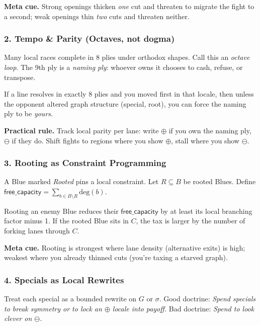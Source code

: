 \documentclass[11pt]{article}
\begin{document}
\begin{itemize}
\noindent\textbf{Meta cue.} Strong openings thicken \emph{one} cut and threaten to migrate the fight to a second; weak openings thin \emph{two} cuts and threaten neither.

\subsubsection{2. Tempo \& Parity (Octaves, not dogma)}
\label{ael-core:parity}
Many local races complete in \(8\) plies under orthodox shapes. Call this an \emph{octave loop}. The 9th ply is a \emph{naming ply}: whoever owns it chooses to cash, refuse, or transpose.

\begin{proposition}
If a line resolves in exactly \(8\) plies and you moved first in that locale, then unless the opponent altered graph structure (special, root), you can force the naming ply to be \emph{yours}. 
\end{proposition}

\noindent\textbf{Practical rule.} Track local parity per lane: write \(\oplus\) if you own the naming ply, \(\ominus\) if they do. Shift fights to regions where you show \(\oplus\), stall where you show \(\ominus\).

\subsubsection{3. Rooting as Constraint Programming}
\label{ael-core:root}
A Blue marked \emph{Rooted} pins a local constraint. Let \(R\subseteq B\) be rooted Blues. Define \(\mathsf{free\_capacity} = \sum_{b\in B\setminus R}\text{deg}(b)\). 

\begin{lemma}
Rooting an enemy Blue reduces their \(\mathsf{free\_capacity}\) by at least its local branching factor minus 1. If the rooted Blue sits in \(C\), the tax is larger by the number of forking lanes through \(C\).
\end{lemma}

\noindent\textbf{Meta cue.} Rooting is strongest where lane density (alternative exits) is high; weakest where you already thinned cuts (you’re taxing a starved graph).

\subsubsection{4. Specials as Local Rewrites}
\label{ael-core:specials}
Treat each special as a bounded rewrite on \(G\) or \(\sigma\). Good doctrine: \emph{Spend specials to break symmetry or to lock an \(\oplus\) locale into payoff.} Bad doctrine: \emph{Spend to look clever on \(\ominus\).} 


\end{itemize}
\end{document}
